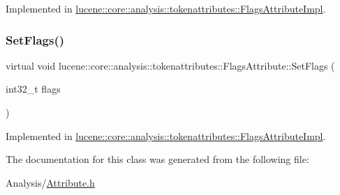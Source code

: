 Implemented in \mbox{\hyperlink{classlucene_1_1core_1_1analysis_1_1tokenattributes_1_1FlagsAttributeImpl_aa3fb651752273e55f85419ef522eaa3e}{lucene\+::core\+::analysis\+::tokenattributes\+::\+Flags\+Attribute\+Impl}}.

\mbox{\label{classlucene_1_1core_1_1analysis_1_1tokenattributes_1_1FlagsAttribute_a95bb70b836e238f5134a0ba12bb01d3d}} 
\subsubsection{\texorpdfstring{Set\+Flags()}{SetFlags()}}
{\footnotesize\ttfamily virtual void lucene\+::core\+::analysis\+::tokenattributes\+::\+Flags\+Attribute\+::\+Set\+Flags (\begin{DoxyParamCaption}\item[{int32\+\_\+t}]{flags }\end{DoxyParamCaption})\hspace{0.3cm}{\ttfamily [pure virtual]}}



Implemented in \mbox{\hyperlink{classlucene_1_1core_1_1analysis_1_1tokenattributes_1_1FlagsAttributeImpl_a89376727686a4e0cc86db2154dc2ea49}{lucene\+::core\+::analysis\+::tokenattributes\+::\+Flags\+Attribute\+Impl}}.



The documentation for this class was generated from the following file\+:\begin{DoxyCompactItemize}
\item 
Analysis/\mbox{\hyperlink{Analysis_2Attribute_8h}{Attribute.\+h}}\end{DoxyCompactItemize}
